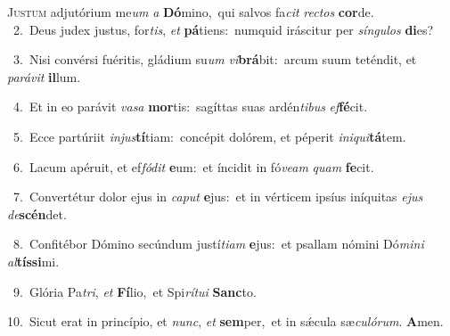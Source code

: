 \lettrine{\initial\textcolor{\initialcolor}{J}}{ustum} adjutórium me\textit{um} \textit{a} \textbf{Dó}\-mino,~\star qui salvos fa\textit{cit} \textit{rec}\-\textit{tos} \textbf{cor}\-de.\\
{\numbfont\textcolor{\numbcolor}{~2.}}~Deus judex justus, for\-\textit{tis}\-, \textit{et} \textbf{pá}\-tiens:~\star numquid iráscitur per \textit{sín}\-\textit{gu}\textit{los} \textbf{di}\-es?\par
{\numbfont\textcolor{\numbcolor}{~3.}}~Nisi convérsi fuéritis, gládium su\textit{um} \textit{vi}\-\textbf{brá}bit:~\star arcum suum teténdit, et \textit{pa}\-\textit{rá}\textit{vit} \textbf{il}\-lum.\par
{\numbfont\textcolor{\numbcolor}{~4.}}~Et in eo parávit \textit{va}\-\textit{sa} \textbf{mor}\-tis:~\star sagíttas suas ardén\-\textit{ti}\-\textit{bus} \textit{ef}\-\textbf{fé}cit.\par
{\numbfont\textcolor{\numbcolor}{~5.}}~Ecce partúriit \textit{in}\-\textit{jus}\textbf{tí}tiam:~\star concépit dolórem, et péperit \textit{in}\-\textit{i}\textit{qui}\textbf{tá}tem.\par
{\numbfont\textcolor{\numbcolor}{~6.}}~Lacum apéruit, et ef\-\textit{fó}\-\textit{dit} \textbf{e}\-um:~\star et íncidit in fó\-\textit{ve}\-\textit{am} \textit{quam} \textbf{fe}\-cit.\par
{\numbfont\textcolor{\numbcolor}{~7.}}~Convertétur dolor ejus in \textit{ca}\-\textit{put} \textbf{e}\-jus:~\star et in vérticem ipsíus iníquitas \textit{e}\-\textit{jus} \textit{de}\-\textbf{scén}det.\par
{\numbfont\textcolor{\numbcolor}{~8.}}~Confitébor Dómino secúndum justí\-\textit{ti}\-\textit{am} \textbf{e}\-jus:~\star et psallam nómini Dó\-\textit{mi}\-\textit{ni} \textit{al}\-\textbf{tís}\textbf{si}mi.\par
{\numbfont\textcolor{\numbcolor}{~9.}}~Glória Pa\-\textit{tri}\-, \textit{et} \textbf{Fí}\-lio,~\star et Spi\-\textit{rí}\-\textit{tu}\textit{i} \textbf{Sanc}\-to.\par
{\numbfont\textcolor{\numbcolor}{10.}}~Sicut erat in princípio, et \textit{nunc}\-, \textit{et} \textbf{sem}\-per,~\star et in sǽcula sæ\-\textit{cu}\-\textit{ló}\textit{rum}. \textbf{A}\-men.\par
